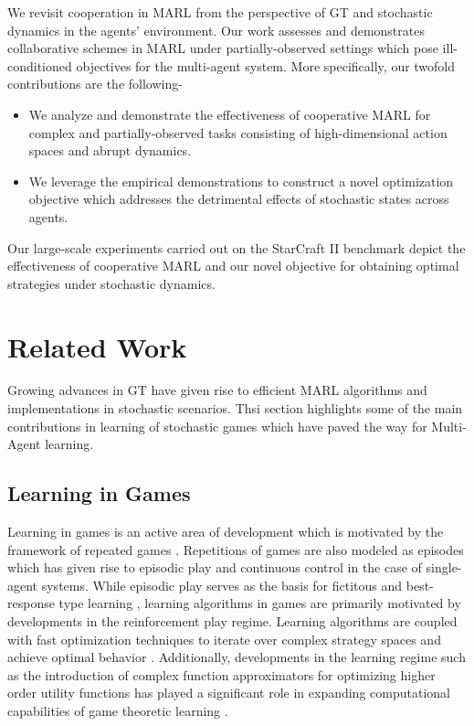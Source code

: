 \documentclass{article}
\begin{document}
\begin{multicols}{2}
We revisit cooperation in MARL from the perspective of GT and stochastic dynamics in the agents' environment. Our work assesses and demonstrates collaborative schemes in MARL under partially-observed settings which pose ill-conditioned objectives for the multi-agent system. More specifically, our twofold contributions are the following- 

\begin{itemize}[leftmargin=*]
\item We analyze and demonstrate the effectiveness of cooperative MARL for complex and partially-observed tasks consisting of high-dimensional action spaces and abrupt dynamics.
\item We leverage the empirical demonstrations to construct a novel optimization objective which addresses the detrimental effects of stochastic states across agents. 
\end{itemize}

Our large-scale experiments carried out on the StarCraft II benchmark depict the effectiveness of cooperative MARL and our novel objective for obtaining optimal strategies under stochastic dynamics.

\section{Related Work}
Growing advances in GT have given rise to efficient MARL algorithms and implementations in stochastic scenarios. Thsi section highlights some of the main contributions in learning of stochastic games which have paved the way for Multi-Agent learning. 

\subsection{Learning in Games}
Learning in games is an active area of development which is motivated by the framework of repeated games \cite{learningingames}. Repetitions of games are also modeled as episodes which has given rise to episodic play and continuous control in the case of single-agent systems. While episodic play serves as the basis for fictitous \cite{benaim} and best-response type learning \cite{learningingames}, learning algorithms in games are primarily motivated by developments in the reinforcement play regime\cite{rl}. Learning algorithms are coupled with fast optimization techniques \cite{atari} to iterate over complex strategy spaces and achieve optimal behavior \cite{rl}. Additionally, developments in the learning regime such as the introduction of complex function approximators \cite{cnn} for optimizing higher order utility functions has played a significant role in expanding computational capabilities of game theoretic learning \cite{ale}. 


\end{multicols}
\end{document}
